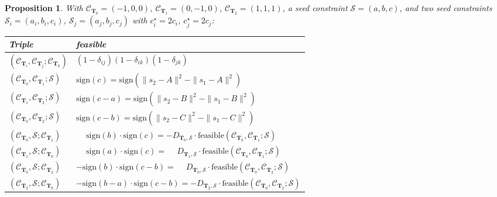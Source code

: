 \documentclass[12pt]{article}
\newtheorem{proposition}[theorem]{Proposition}
\theoremstyle{definition}
\theoremstyle{remark}
\begin{document}
\begin{proposition}\label{prop:case-table}
With $\mathcal C_{\mathbf T_0}=(-1,0,0)$, $\mathcal C_{\mathbf T_1}=(0,-1,0)$,
$\mathcal C_{\mathbf T_2}=(1,1,1)$, a seed constraint $\mathcal S=(a,b,c)$,
and two seed constraints $\mathcal S_i=(a_i,b_i,c_i)$, $\mathcal
S_j=(a_j,b_j,c_j)$ with $c_i^\star=2c_i$, $c_j^\star=2c_j$:

\medskip
\begin{table}[h!]
\centering
\renewcommand{\arraystretch}{1.2}
\begin{tabular}{ll}
\hline
\textbf{Triple} & \textbf{feasible} \\
\hline
$(\mathcal{C}_{\mathbf{T}_i}, \mathcal{C}_{\mathbf{T}_j}; \mathcal{C}_{\mathbf{T}_k})$
    & $(1-\delta_{ij})(1-\delta_{ik})(1-\delta_{jk})$ \\
\hline
$(\mathcal{C}_{\mathbf{T}_0}, \mathcal{C}_{\mathbf{T}_1}; \mathcal{S})$
    & $\mathrm{sign}(c) = \mathrm{sign}(\|s_2-A\|^2 - \|s_1-A\|^2)$ \\
$(\mathcal{C}_{\mathbf{T}_1}, \mathcal{C}_{\mathbf{T}_2}; \mathcal{S})$
    & $\mathrm{sign}(c-a) = \mathrm{sign}(\|s_2-B\|^2 - \|s_1-B\|^2)$ \\
$(\mathcal{C}_{\mathbf{T}_0}, \mathcal{C}_{\mathbf{T}_2}; \mathcal{S})$
    & $\mathrm{sign}(c-b) = \mathrm{sign}(\|s_2-C\|^2 - \|s_1-C\|^2)$ \\
\hline
$(\mathcal{C}_{\mathbf{T}_0}, \mathcal{S}; \mathcal{C}_{\mathbf{T}_1})$
    & $\phantom{-}\mathrm{sign}(b) \cdot \mathrm{sign}(c) = - D_{\mathbf{T}_0, \mathcal{S}} \cdot \mathrm{feasible}(\mathcal{C}_{\mathbf{T}_0}, \mathcal{C}_{\mathbf{T}_1}; \mathcal{S})$ \\
$(\mathcal{C}_{\mathbf{T}_1}, \mathcal{S}; \mathcal{C}_{\mathbf{T}_0})$
    & $\phantom{-}\mathrm{sign}(a) \cdot \mathrm{sign}(c) = \phantom{-}D_{\mathbf{T}_1, \mathcal{S}} \cdot \mathrm{feasible}(\mathcal{C}_{\mathbf{T}_0}, \mathcal{C}_{\mathbf{T}_1}; \mathcal{S})$ \\
$(\mathcal{C}_{\mathbf{T}_0}, \mathcal{S}; \mathcal{C}_{\mathbf{T}_2})$
    & $-\mathrm{sign}(b) \cdot \mathrm{sign}(c-b) = \phantom{-} D_{\mathbf{T}_0, \mathcal{S}} \cdot \mathrm{feasible}(\mathcal{C}_{\mathbf{T}_0}, \mathcal{C}_{\mathbf{T}_2}; \mathcal{S})$ \\
$(\mathcal{C}_{\mathbf{T}_2}, \mathcal{S}; \mathcal{C}_{\mathbf{T}_0})$
    & $-\mathrm{sign}(b-a) \cdot \mathrm{sign}(c-b) = -D_{\mathbf{T}_2, \mathcal{S}} \cdot \mathrm{feasible}(\mathcal{C}_{\mathbf{T}_0}, \mathcal{C}_{\mathbf{T}_2}; \mathcal{S})$ \\

\end{tabular}
\end{table}
\end{proposition}
\end{document}
